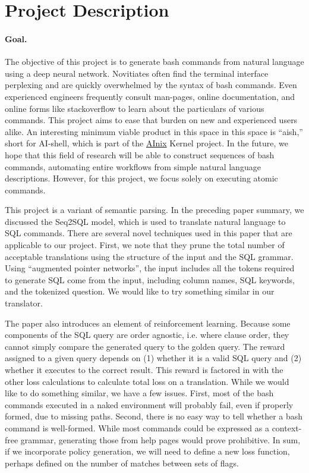 \documentclass[12pt]{article}
\begin{document}
\section{Project Description}

\paragraph{Goal.}
The objective of this project is to generate bash commands from natural
language using a deep neural network. Novitiates often find the terminal
interface perplexing and are quickly overwhelmed by the syntax of bash
commands. Even experienced engineers frequently consult man-pages, online
documentation, and online forms like stackoverflow to learn about the
particulars of various commands. This project aims to ease that burden on new
and experienced users alike. An interesting minimum viable product in this
space in this space is ``aish,'' short for AI-shell, which is part of the
\href{http://anix.org}{AInix} Kernel project. In the future, we hope that this
field of research will be able to construct sequences of bash commands,
automating entire workflows from simple natural language descriptions. However,
for this project, we focus solely on executing atomic commands.
\par
This project is a variant of semantic parsing. In the preceding paper summary,
we discussed the Seq2SQL model, which is used to translate natural language to
SQL commands. There are several novel techniques used in this paper that are
applicable to our project. First, we note that they prune the total number of
acceptable translations using the structure of the input and the SQL grammar.
Using ``augmented pointer networks'', the input includes all the tokens
required to generate SQL come from the input, including column names, SQL
keywords, and the tokenized question. We would like to try something similar in
our translator.
\par
The paper also introduces an element of reinforcement learning. Because some
components of the SQL query are order agnostic, i.e. where clause order, they
cannot simply compare the generated query to the golden query. The reward
assigned to a given query depends on (1) whether it is a valid SQL query and
(2) whether it executes to the correct result. This reward is factored in with
the other loss calculations to calculate total loss on a translation. While we
would like to do something similar, we have a few issues. First, most of the
bash commands executed in a naked environment will probably fail, even if
properly formed, due to missing paths. Second, there is no easy way to tell
whether a bash command is well-formed. While most commands could be expressed
as a context-free grammar, generating those from help pages would prove
prohibitive. In sum, if we incorporate policy generation, we will need to
define a new loss function, perhaps defined on the number of matches between
sets of flags.
\end{document}

